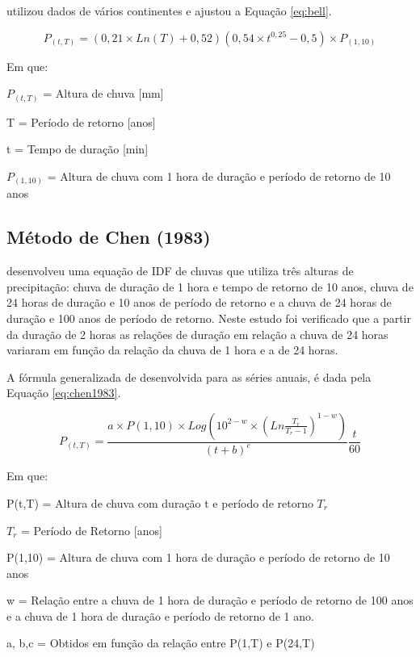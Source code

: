  utilizou dados de vários continentes e ajustou a Equação \ref{eq:bell}.

\begin{equation}
\label{eq:bell}
    P_{(t,T)} = (0,21 \times Ln(T) + 0,52)(0,54\times t^{0,25} -0,5) \times P_{(1,10)}
\end{equation}

Em que:

$P_{(t,T)}$ = Altura de chuva [mm]

T = Período de retorno [anos]

t = Tempo de duração [min]

$P_{(1,10)}$ = Altura de chuva com 1 hora de duração e período de retorno de 10 anos


\subsection{Método de Chen (1983)}

 desenvolveu uma equação de IDF de chuvas que utiliza três alturas de precipitação: chuva de duração de 1 hora e tempo de retorno de 10 anos, chuva de 24 horas de duração e 10 anos de período de retorno e a chuva de 24 horas de duração e 100 anos de período de retorno. Neste estudo foi verificado que a partir da duração de 2 horas as relações de duração em relação a chuva de 24 horas variaram em função da relação da chuva de 1 hora e a de 24 horas.

A fórmula generalizada de  desenvolvida para as séries anuais, é dada pela Equação \ref{eq:chen1983}.

\begin{equation}
\label{eq:chen1983}
    P_{(t,T)} = \frac{a\times P(1,10)\times Log(10^{2-w}\times (Ln\frac{T_r}{T_r-1})^{1-w})}{(t+b)^c} \frac{t}{60}
\end{equation}

Em que:

P(t,T) = Altura de chuva com duração t e período de retorno $T_r$

$T_r$ = Período de Retorno [anos]

P(1,10) = Altura de chuva com 1 hora de duração e período de retorno de 10 anos

w = Relação entre a chuva de 1 hora de duração e período de retorno de 100 anos e a chuva de 1 hora de duração e período de retorno de 1 ano.

a, b,c = Obtidos em função da relação entre P(1,T) e P(24,T)

